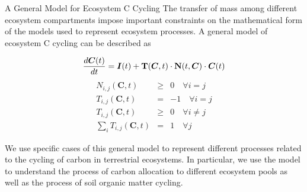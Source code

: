\documentclass[final,hyperref={pdfpagelabels=false}, professionalmath, mathserif, 11pt]{beamer}
\begin{document}
\begin{frame}
%
\begin{columns}
  
  \begin{column}{.48\textwidth}
    \begin{minipage}[T]{.95\textwidth}
    \begin{block}{A General Model for Ecosystem C Cycling}
      The transfer of mass among different ecosystem compartments impose important constraints on the mathematical form of the models used to represent ecosystem processes. A general model of ecosystem C cycling can be described as
      
    		\[
    		\frac{d \bm{C}(t)}{dt} = \bm{I}(t) + {\bf T}(\bm{C},t) \cdot {\bf N}(t, \bm{C}) \cdot \bm{C}(t)
    		\]
    		\begin{equation*}	
    		\label{structCond}
    		\begin{array}{lcl}	
    		N_{i,j}(\bm{C},t) 		&\ge& 	 0 \quad \forall i = j \\
    		T_{i,j}(\bm{C},t) 		&=& 	 -1 \quad \forall i = j \\
    		T_{i,j}(\bm{C},t) 		&\ge& 	 0 \quad \forall i \ne j \\
    		\sum_i T_{i,j}(\bm{C},t) 	&=  &	 1\quad \forall j 
    		\end{array}	
    		\end{equation*}	
 
 \vspace{1cm}   
    We use specific cases of this general model to represent different processes related to the cycling of carbon in terrestrial ecosystems. In particular, we use the model to understand the process of carbon allocation to different ecosystem pools as well as the process of soil organic matter cycling.

    \end{block}


\end{minipage}
\end{column}
\end{columns}
\end{frame}
\end{document}
